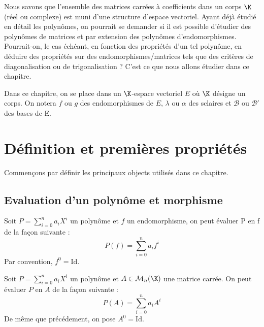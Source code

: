 

\justify 

\setlength{\parindent}{0pt}




Nous savons que l'ensemble des matrices carrées à coefficients dans un corps $\K$ (réel ou complexe) est 
muni d'une structure d'espace vectoriel. 
Ayant déjà étudié en détail les polynômes, on pourrait se demander si il est possible d'étudier des polynômes de matrices 
et par extension des polynômes d'endomorphismes. 
Pourrait-on, le cas échéant, en fonction des propriétés d'un tel polynôme, en déduire des propriétés sur des endomorphismes/matrices 
tels que des critères de diagonalisation ou de trigonalisation ?
C'est ce que nous allons étudier dans ce chapitre. 

\vspace{0.3cm}

Dans ce chapitre, on se place dans un $\K$-espace vectoriel $E$ où $\K$ désigne un corps. 
On notera $f$ ou $g$ des endomorphismes de $E$, $\lambda$ ou $\alpha$ des sclaires et $\mathcal{B}$ ou $\mathcal{B}'$ des bases de E. 




\section{Définition et premières propriétés}

Commençons par définir les principaux objects utilisés dans ce chapitre. 

\subsection{Evaluation d'un polynôme et morphisme}

\begin{definition}
    Soit $P = \sum_{i=0}^{n} a_i X^i$ un polynôme et $f$ un endomorphisme, on peut évaluer P en f de la façon suivante :
        \[ P(f) = \sum_{i=0}^{n} a_i f^i \]
    Par convention, $f^0 = \text{Id}$. 
\end{definition}

\begin{definition}
    Soit $P = \sum_{i=0}^{n} a_i X^i$ un polynôme et $A \in \mathcal{M}_n(\K)$ une matrice carrée. 
    On peut évaluer $P$ en $A$ de la façon suivante :
        \[P(A) = \sum_{i=0}^{n} a_i A^i\]
    De même que précédement, on pose $A^0 = \text{Id}$.
\end{definition}


